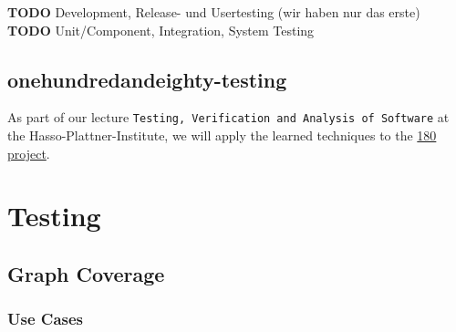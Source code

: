 \documentclass[ngerman]{article}
\begin{document}
\textbf{TODO} Development, Release- und Usertesting (wir haben nur das
erste) \textbf{TODO} Unit/Component, Integration, System Testing

\subsection{onehundredandeighty-testing}\label{onehundredandeighty-testing}

As part of our lecture
\texttt{Testing, Verification and Analysis of Software} at the
Hasso-Plattner-Institute, we will apply the learned techniques to the
\href{https://github.com/knub/onehundredandeighty}{180 project}.


\section{Testing}

\subsection{Graph Coverage}
\subsubsection{Use Cases}
\end{document}
